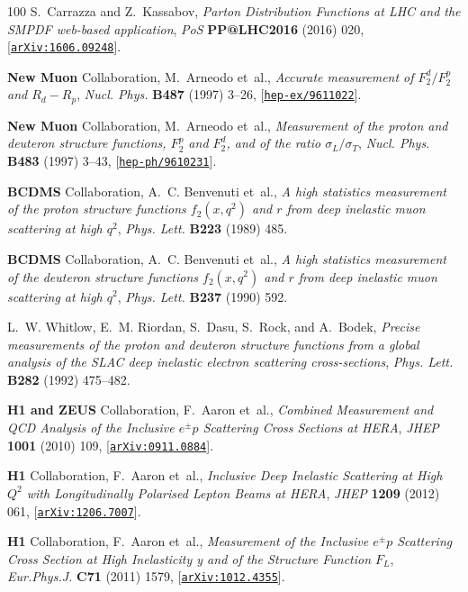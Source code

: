 \begin{thebibliography}{100}
S.~Carrazza and Z.~Kassabov, {\it {Parton Distribution Functions at LHC and the
  SMPDF web-based application}},  {\em PoS} {\bf PP@LHC2016} (2016) 020,
  [\href{http://arxiv.org/abs/1606.09248}{{\tt arXiv:1606.09248}}].

{\bf New Muon} Collaboration, M.~Arneodo et~al., {\it {Accurate measurement of
  $F_2^d/F_2^p$ and $R_d-R_p$}},  {\em Nucl. Phys.} {\bf B487} (1997) 3--26,
  [\href{http://arxiv.org/abs/hep-ex/9611022}{{\tt hep-ex/9611022}}].

{\bf New Muon} Collaboration, M.~Arneodo et~al., {\it {Measurement of the
  proton and deuteron structure functions, $F_2^p$ and $F_2^d$, and of the
  ratio $\sigma_L/\sigma_T$}},  {\em Nucl. Phys.} {\bf B483} (1997) 3--43,
  [\href{http://arxiv.org/abs/hep-ph/9610231}{{\tt hep-ph/9610231}}].

{\bf BCDMS} Collaboration, A.~C. Benvenuti et~al., {\it A high statistics
  measurement of the proton structure functions $f_2 (x, q^2)$ and $r$ from
  deep inelastic muon scattering at high $q^2$},  {\em Phys. Lett.} {\bf B223}
  (1989) 485.

{\bf BCDMS} Collaboration, A.~C. Benvenuti et~al., {\it A high statistics
  measurement of the deuteron structure functions $f_2 (x, q^2)$ and $r$ from
  deep inelastic muon scattering at high $q^2$},  {\em Phys. Lett.} {\bf B237}
  (1990) 592.

L.~W. Whitlow, E.~M. Riordan, S.~Dasu, S.~Rock, and A.~Bodek, {\it {Precise
  measurements of the proton and deuteron structure functions from a global
  analysis of the SLAC deep inelastic electron scattering cross-sections}},
  {\em Phys. Lett.} {\bf B282} (1992) 475--482.

{\bf H1 and ZEUS} Collaboration, F.~Aaron et~al., {\it {Combined Measurement
  and QCD Analysis of the Inclusive $e^{\pm}p$ Scattering Cross Sections at
  HERA}},  {\em JHEP} {\bf 1001} (2010) 109,
  [\href{http://arxiv.org/abs/0911.0884}{{\tt arXiv:0911.0884}}].

{\bf H1} Collaboration, F.~Aaron et~al., {\it {Inclusive Deep Inelastic
  Scattering at High $Q^2$ with Longitudinally Polarised Lepton Beams at
  HERA}},  {\em JHEP} {\bf 1209} (2012) 061,
  [\href{http://arxiv.org/abs/1206.7007}{{\tt arXiv:1206.7007}}].

{\bf H1} Collaboration, F.~Aaron et~al., {\it {Measurement of the Inclusive
  $e^{\pm}p$ Scattering Cross Section at High Inelasticity y and of the
  Structure Function $F_L$}},  {\em Eur.Phys.J.} {\bf C71} (2011) 1579,
  [\href{http://arxiv.org/abs/1012.4355}{{\tt arXiv:1012.4355}}].


\end{thebibliography}
